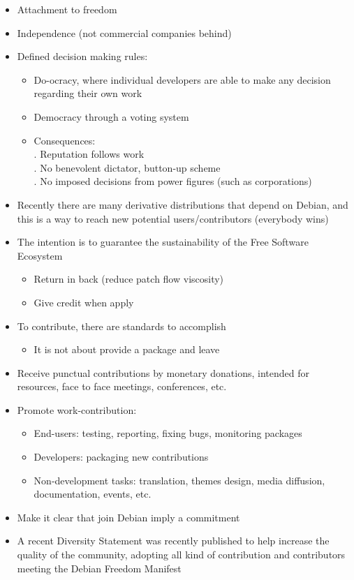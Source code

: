 \documentclass[11pt]{article} %
\begin{document}
\begin{itemize}
  	  \item Attachment to freedom
  	  \item Independence (not commercial companies behind)
  	  \item Defined decision making rules:
	  	\begin{itemize}
	  	  \item Do-ocracy, where individual developers are able to make any decision regarding their own work
	  	  \item Democracy through a voting system
	  	  \item Consequences:\\
	  	  		. Reputation follows work\\
	  	  		. No benevolent dictator, button-up scheme\\
	  	  		. No imposed decisions from power figures (such as corporations)	  	  
	  	\end{itemize} 
  	  \item Recently there are many derivative distributions that depend on Debian, and this is a way to reach new potential users/contributors (everybody wins)
  	  \item The intention is to guarantee the sustainability of the Free Software Ecosystem
	  	\begin{itemize}
	  	  \item Return in back (reduce patch flow viscosity)
	  	  \item Give credit when apply
	  	\end{itemize} 
  	  \item To contribute, there are standards to accomplish
	  	\begin{itemize}
	  	  \item It is not about provide a package and leave
	  	\end{itemize}
  	  \item Receive punctual contributions by monetary donations, intended for resources, face to face meetings, conferences, etc.
  	  \item Promote work-contribution:
	  	\begin{itemize}
	  	  \item End-users: testing, reporting, fixing bugs, monitoring packages
	  	  \item Developers: packaging new contributions
	  	  \item Non-development tasks: translation, themes design, media diffusion, documentation, events, etc.
	  	\end{itemize}
	  \item Make it clear that join Debian imply a commitment
	  \item A recent Diversity Statement was recently published to help increase the quality of the community, adopting all kind of contribution and contributors meeting the Debian Freedom Manifest  	  
  	\end{itemize}
\end{document}
